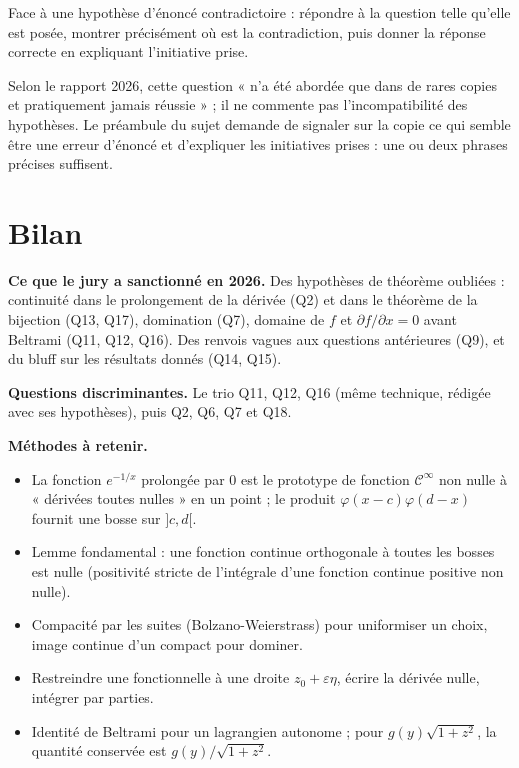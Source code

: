 \documentclass[11pt,a4paper]{article}
\providecommand{\tightlist}{\setlength{\itemsep}{0pt}\setlength{\parskip}{0pt}}
\begin{document}
\begin{methode}

Face à une hypothèse d'énoncé contradictoire : répondre à la question telle qu'elle est posée, montrer précisément où est la contradiction, puis donner la réponse correcte en expliquant l'initiative prise.

\end{methode}

\begin{jury}

Selon le rapport 2026, cette question « n'a été abordée que dans de rares copies et pratiquement jamais réussie » ; il ne commente pas l'incompatibilité des hypothèses. Le préambule du sujet demande de signaler sur la copie ce qui semble être une erreur d'énoncé et d'expliquer les initiatives prises : une ou deux phrases précises suffisent.

\end{jury}

\hypertarget{bilan}{%
\section{Bilan}\label{bilan}}

\textbf{Ce que le jury a sanctionné en 2026.} Des hypothèses de théorème oubliées : continuité dans le prolongement de la dérivée (Q2) et dans le théorème de la bijection (Q13, Q17), domination (Q7), domaine de \(f\) et \(\partial f/\partial x=0\) avant Beltrami (Q11, Q12, Q16). Des renvois vagues aux questions antérieures (Q9), et du bluff sur les résultats donnés (Q14, Q15).

\textbf{Questions discriminantes.} Le trio Q11, Q12, Q16 (même technique, rédigée avec ses hypothèses), puis Q2, Q6, Q7 et Q18.

\textbf{Méthodes à retenir.}

\begin{itemize}
\tightlist
\item
  La fonction \(e^{-1/x}\) prolongée par \(0\) est le prototype de fonction \(\mathcal C^\infty\) non nulle à « dérivées toutes nulles » en un point ; le produit \(\varphi(x-c)\varphi(d-x)\) fournit une bosse sur \(]c,d[\).
\item
  Lemme fondamental : une fonction continue orthogonale à toutes les bosses est nulle (positivité stricte de l'intégrale d'une fonction continue positive non nulle).
\item
  Compacité par les suites (Bolzano-Weierstrass) pour uniformiser un choix, image continue d'un compact pour dominer.
\item
  Restreindre une fonctionnelle à une droite \(z_0+\varepsilon\eta\), écrire la dérivée nulle, intégrer par parties.
\item
  Identité de Beltrami pour un lagrangien autonome ; pour \(g(y)\sqrt{1+z^2}\), la quantité conservée est \(g(y)/\sqrt{1+z^2}\).
\end{itemize}
\end{document}
